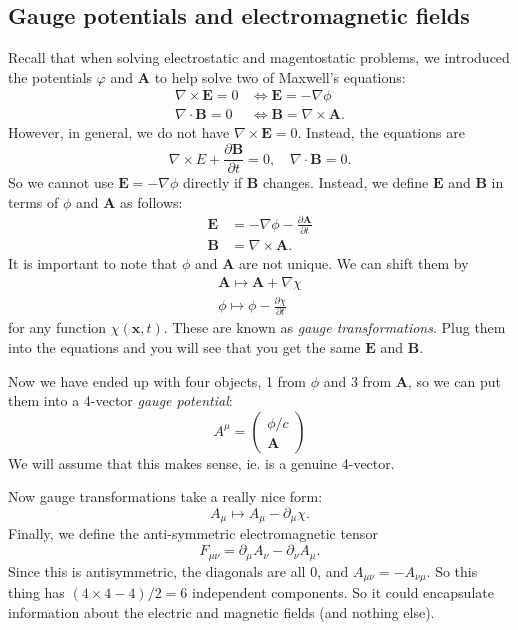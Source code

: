 \documentclass[a4paper]{article}
\begin{document}
\subsection{Gauge potentials and electromagnetic fields}
Recall that when solving electrostatic and magentostatic problems, we introduced the potentials $\varphi$ and $\mathbf{A}$ to help solve two of Maxwell's equations:
\begin{align*}
  \nabla\times \mathbf{E} = 0 &\Leftrightarrow \mathbf{E} = -\nabla \phi\\
  \nabla\cdot \mathbf{B} = 0 &\Leftrightarrow \mathbf{B} = \nabla\times \mathbf{A}.
\end{align*}
However, in general, we do not have $\nabla \times \mathbf{E} = 0$. Instead, the equations are
\[
  \nabla\times E + \frac{\partial \mathbf{B}}{\partial t} = 0,\quad \nabla\cdot \mathbf{B} = 0.
\]
So we cannot use $\mathbf{E} = -\nabla \phi$ directly if $\mathbf{B}$ changes. Instead, we define $\mathbf{E}$ and $\mathbf{B}$ in terms of $\phi$ and $\mathbf{A}$ as follows:
\begin{align*}
  \mathbf{E} &= -\nabla\phi - \frac{\partial \mathbf{A}}{\partial t}\\
  \mathbf{B} &= \nabla\times \mathbf{A}.
\end{align*}
It is important to note that $\phi$ and $\mathbf{A}$ are not unique. We can shift them by
\begin{align*}
  \mathbf{A} \mapsto \mathbf{A} + \nabla \chi\\
  \phi \mapsto \phi - \frac{\partial \chi}{\partial t}
\end{align*}
for any function $\chi(\mathbf{x}, t)$. These are known as \emph{gauge transformations}. Plug them into the equations and you will see that you get the same $\mathbf{E}$ and $\mathbf{B}$.

Now we have ended up with four objects, 1 from $\phi$ and 3 from $\mathbf{A}$, so we can put them into a 4-vector \emph{gauge potential}:
\[
  A^\mu =
  \begin{pmatrix}
    \phi/c\\
    \mathbf{A}
  \end{pmatrix}\]
We will assume that this makes sense, ie. is a genuine 4-vector.

Now gauge transformations take a really nice form:
\[
  A_\mu \mapsto A_\mu - \partial_\mu\chi.
\]
Finally, we define the anti-symmetric electromagnetic tensor
\[
  F_{\mu\nu} = \partial_\mu A_\nu -\partial_\nu A_\mu.
\]
Since this is antisymmetric, the diagonals are all 0, and $A_{\mu\nu} = -A_{\nu\mu}$. So this thing has $(4 \times 4 - 4)/2 = 6$ independent components. So it could encapsulate information about the electric and magnetic fields (and nothing else).
\end{document}
